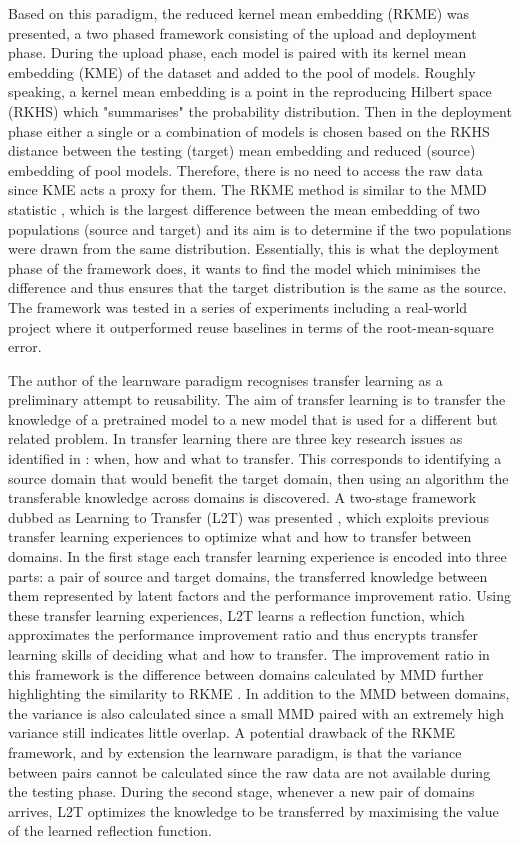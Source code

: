 \documentclass{mpaper}
\begin{document}
Based on this paradigm, the reduced kernel mean embedding (RKME) \cite{KernelMMD} was presented, a two phased framework consisting of the upload and deployment phase. During the upload phase, each model is paired with its kernel mean embedding (KME) of the dataset and added to the pool of models. Roughly speaking, a kernel mean embedding is a point in the reproducing Hilbert space (RKHS) which "summarises" the probability distribution. Then in the deployment phase either a single or a combination of models is chosen based on the RKHS distance between the testing (target) mean embedding and reduced (source) embedding of pool models. Therefore, there is no need to access the raw data since KME acts a proxy for them. The RKME method is similar to the MMD  statistic \cite{OriginalMMD}, which is the largest difference between the mean embedding of two populations (source and target) and its aim is to determine if the two populations were drawn from the same distribution. Essentially, this is what the deployment phase of the framework does, it wants to find the model which minimises the difference and thus ensures that the target distribution is the same as the source. The framework was tested in a series of experiments including a real-world project where it outperformed reuse baselines in terms of the root-mean-square error.

The author of the learnware paradigm \cite{Learnware} recognises transfer learning as a preliminary attempt to reusability. The aim of transfer learning is to transfer the knowledge of a pretrained model to a new model that is used for a different but related problem. In transfer learning there are three key research issues as identified in \cite{DefinitionTL}: when, how and what to transfer. This corresponds to identifying a source domain that would benefit the target domain, then using an algorithm the transferable knowledge across domains is discovered. A two-stage framework dubbed as Learning to Transfer (L2T) was presented \cite{L2T}, which exploits previous transfer learning experiences to optimize what and how to transfer between domains. In the first stage each transfer learning experience is encoded into three parts: a pair of source and target domains, the transferred knowledge between them represented by latent factors and the performance improvement ratio. Using these transfer learning experiences, L2T learns a reflection function, which approximates the performance improvement ratio and thus encrypts transfer learning skills of deciding what and how to transfer. The improvement ratio in this framework is the difference between domains calculated by MMD further highlighting the similarity to RKME \cite{KernelMMD}. In addition to the MMD between domains, the variance is also calculated since a small MMD paired with an extremely high variance still indicates little overlap. A potential drawback of the RKME \cite{KernelMMD} framework, and by extension the learnware paradigm, is that the variance between pairs cannot be calculated since the raw data are not available during the testing phase. During the second stage, whenever a new pair of domains arrives, L2T optimizes the knowledge to be transferred by maximising the value of the learned reflection function.
\end{document}
